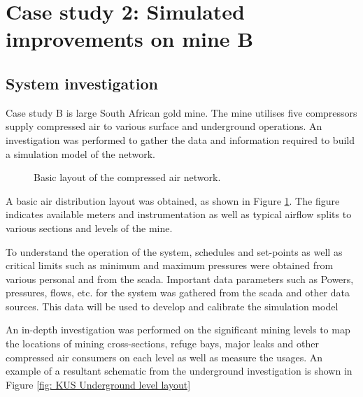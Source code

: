\section{Case study 2: Simulated improvements on mine B}
	\subsection{System investigation}
	Case study B is large South African gold mine. The mine utilises five compressors supply compressed air to various surface and underground operations. An investigation was performed to gather the data and information required to build a simulation model of the network.
	\par 
	\begin{figure}[h!]
		\centering
		\caption{Basic layout of the compressed air network.}
		\label{fig: KUS Air layout}
	\end{figure}
	A basic air distribution layout was obtained, as shown in Figure \ref{fig: KUS Air layout}.  The figure indicates available meters and instrumentation as well as typical airflow splits to various sections and levels of the mine.
	\par 

 To understand the operation of the system, schedules and set-points as well as critical limits such as minimum and maximum pressures were obtained from various personal and from the \gls{scada}. Important data parameters such as Powers, pressures, flows, etc. for the system was gathered from the \gls{scada} and other data sources. This data will be used to develop and calibrate the simulation model
\par 
		
	An in-depth investigation was performed on the significant mining levels to map the locations of mining cross-sections, refuge bays, major leaks and other compressed air consumers on each level as well as measure the usages. An example of a resultant schematic from the underground investigation is shown in Figure \ref{fig: KUS Underground level layout}
	

